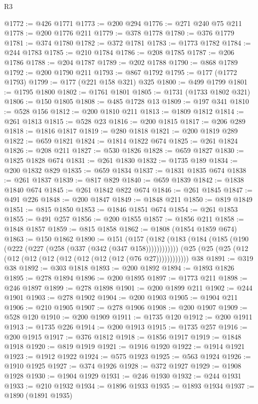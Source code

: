 \begin{lexlean}{R3}
\begin{coremodule}
@1772 := @426 @1771
@1773 := @200 @294
@1776 := @271 @240 @75 @211
@1778 := @200 @1776 @211
@1779 := @378 @1778
@1780 := @376 @1779
@1781 := @374 @1780
@1782 := @372 @1781
@1783 := @1773 @1782
@1784 := @244 @1783
@1785 := @210 @1784
@1786 := @208 @1785
@1787 := @206 @1786
@1788 := @204 @1787
@1789 := @202 @1788
@1790 := @868 @1789
@1792 := @200 @1790 @211
@1793 := @867 @1792
@1795 := @177 (@1772 @1793)
@1799 := @177 (@221 @158 @321) @325
@1800 := @499 @1799
@1801 := @1795 @1800
@1802 := @1761 @1801
@1805 := @1731 (@1733 @1802 @321)
@1806 := @150 @1805
@1808 := @485 @1728 @13
@1809 := @197 @341
@1810 := @528 @156
@1812 := @200 @1810 @211
@1813 := @1809 @1812
@1814 := @261 @1813
@1815 := @528 @23
@1816 := @200 @1815
@1817 := @206 @289
@1818 := @1816 @1817
@1819 := @280 @1818
@1821 := @200 @1819 @289
@1822 := @659 @1821
@1824 := @1814 @1822 @674
@1825 := @261 @1824
@1826 := @208 @211
@1827 := @530 @1826
@1828 := @659 @1827
@1830 := @1825 @1828 @674
@1831 := @261 @1830
@1832 := @1735 @189
@1834 := @200 @1832 @829
@1835 := @659 @1834
@1837 := @1831 @1835 @674
@1838 := @261 @1837
@1839 := @817 @829
@1840 := @659 @1839
@1842 := @1838 @1840 @674
@1845 := @261 @1842 @822 @674
@1846 := @261 @1845
@1847 := @491 @226
@1848 := @200 @1847
@1849 := @1848 @211
@1850 := @819 @1849
@1851 := @815 @1850
@1853 := @1846 @1851 @674
@1854 := @261 @1853
@1855 := @491 @257
@1856 := @200 @1855
@1857 := @1856 @211
@1858 := @1848 @1857
@1859 := @815 @1858
@1862 := @1808 (@1854 @1859 @674)
@1863 := @150 @1862
@1890 := @151
    (@157 (@182 (@183 (@184 (@185 (@190 (@222 (@227 (@258 (@337 (@342 (@347 @158))))))))))))
    (@25 (@25 (@25 (@12 (@12 (@12 (@12 (@12 (@12 (@12 (@12 (@76 @27))))))))))))
    @38
@1891 := @319 @38
@1892 := @303 @1818
@1893 := @200 @1892
@1894 := @1893 @1826
@1895 := @278 @1894
@1896 := @200 @1895
@1897 := @1773 @211
@1898 := @246 @1897
@1899 := @278 @1898
@1901 := @200 @1899 @211
@1902 := @244 @1901
@1903 := @278 @1902
@1904 := @200 @1903
@1905 := @1904 @211
@1906 := @210 @1905
@1907 := @278 @1906
@1908 := @200 @1907
@1909 := @528 @120
@1910 := @200 @1909
@1911 := @1735 @120
@1912 := @200 @1911
@1913 := @1735 @226
@1914 := @200 @1913
@1915 := @1735 @257
@1916 := @200 @1915
@1917 := @376 @1812
@1918 := @1856 @1917
@1919 := @1848 @1918
@1920 := @819 @1919
@1921 := @1916 @1920
@1922 := @1914 @1921
@1923 := @1912 @1922
@1924 := @575 @1923
@1925 := @563 @1924
@1926 := @1910 @1925
@1927 := @374 @1926
@1928 := @372 @1927
@1929 := @1908 @1928
@1930 := @1904 @1929
@1931 := @246 @1930
@1932 := @244 @1931
@1933 := @210 @1932
@1934 := @1896 @1933
@1935 := @1893 @1934
@1937 := @1890 (@1891 @1935)

\end{coremodule}
\end{lexlean}
